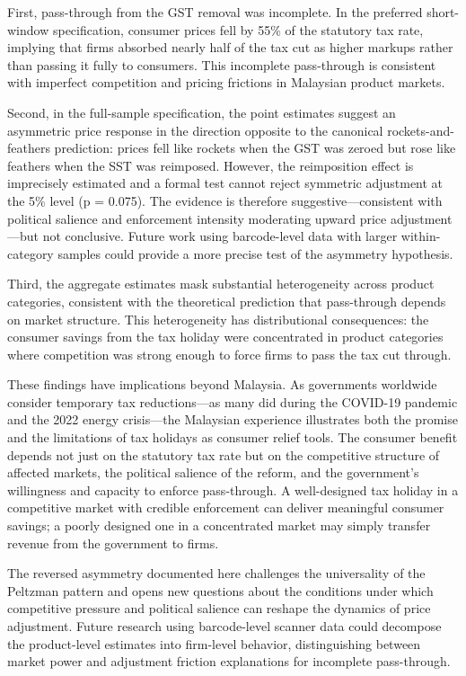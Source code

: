 \documentclass[12pt]{article}
\begin{document}
First, pass-through from the GST removal was incomplete. In the preferred short-window specification, consumer prices fell by 55\% of the statutory tax rate, implying that firms absorbed nearly half of the tax cut as higher markups rather than passing it fully to consumers. This incomplete pass-through is consistent with imperfect competition and pricing frictions in Malaysian product markets.

Second, in the full-sample specification, the point estimates suggest an asymmetric price response in the direction opposite to the canonical rockets-and-feathers prediction: prices fell like rockets when the GST was zeroed but rose like feathers when the SST was reimposed. However, the reimposition effect is imprecisely estimated and a formal test cannot reject symmetric adjustment at the 5\% level (p = 0.075). The evidence is therefore suggestive---consistent with political salience and enforcement intensity moderating upward price adjustment---but not conclusive. Future work using barcode-level data with larger within-category samples could provide a more precise test of the asymmetry hypothesis.

Third, the aggregate estimates mask substantial heterogeneity across product categories, consistent with the theoretical prediction that pass-through depends on market structure. This heterogeneity has distributional consequences: the consumer savings from the tax holiday were concentrated in product categories where competition was strong enough to force firms to pass the tax cut through.

These findings have implications beyond Malaysia. As governments worldwide consider temporary tax reductions---as many did during the COVID-19 pandemic and the 2022 energy crisis---the Malaysian experience illustrates both the promise and the limitations of tax holidays as consumer relief tools. The consumer benefit depends not just on the statutory tax rate but on the competitive structure of affected markets, the political salience of the reform, and the government's willingness and capacity to enforce pass-through. A well-designed tax holiday in a competitive market with credible enforcement can deliver meaningful consumer savings; a poorly designed one in a concentrated market may simply transfer revenue from the government to firms.

The reversed asymmetry documented here challenges the universality of the Peltzman pattern and opens new questions about the conditions under which competitive pressure and political salience can reshape the dynamics of price adjustment. Future research using barcode-level scanner data could decompose the product-level estimates into firm-level behavior, distinguishing between market power and adjustment friction explanations for incomplete pass-through.
\end{document}
